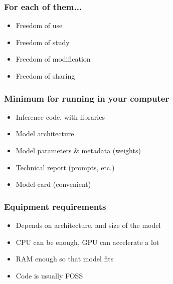 \documentclass[17pt,aspectratio=169,hyperref={pdfusetitle,colorlinks,allcolors=olive}]{beamer}
\begin{document}
\begin{frame}[fragile]
\frametitle{For each of them...}

\begin{itemize}
\item Freedom of use
\item Freedom of study
\item Freedom of modification
\item Freedom of sharing
\end{itemize}
\end{frame}


\begin{frame}[fragile]
\frametitle{Minimum for running in your computer}

\begin{itemize}
\item Inference code, with libraries
\item Model architecture
\item Model parameters \& metadata (weights)
\item Technical report (prompts, etc.)
\item Model card (convenient)
\end{itemize}

\end{frame}

\begin{frame}[fragile]
\frametitle{Equipment requirements}

\begin{itemize}
\item Depends on architecture, and size of the model
\item CPU can be enough, GPU can accelerate a lot
\item RAM enough so that model fits
\item Code is usually FOSS
\end{itemize}

\end{frame}
\end{document}
